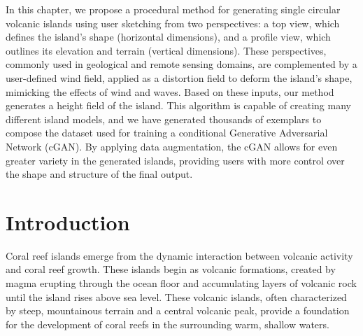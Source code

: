 \abstract 
In this chapter, we propose a procedural method for generating single circular volcanic islands using user sketching from two perspectives: a top view, which defines the island's shape (horizontal dimensions), and a profile view, which outlines its elevation and terrain (vertical dimensions). These perspectives, commonly used in geological and remote sensing domains, are complemented by a user-defined wind field, applied as a distortion field to deform the island's shape, mimicking the effects of wind and waves. Based on these inputs, our method generates a height field of the island. This algorithm is capable of creating many different island models, and we have generated thousands of exemplars to compose the dataset used for training a conditional Generative Adversarial Network (cGAN). By applying data augmentation, the cGAN allows for even greater variety in the generated islands, providing users with more control over the shape and structure of the final output.
\pagebreak 

\minitoc

\section{Introduction}
\label{sec:coral-island_introduction}

Coral reef islands emerge from the dynamic interaction between volcanic activity and coral reef growth. These islands begin as volcanic formations, created by magma erupting through the ocean floor and accumulating layers of volcanic rock until the island rises above sea level. These volcanic islands, often characterized by steep, mountainous terrain and a central volcanic peak, provide a foundation for the development of coral reefs in the surrounding warm, shallow waters.

